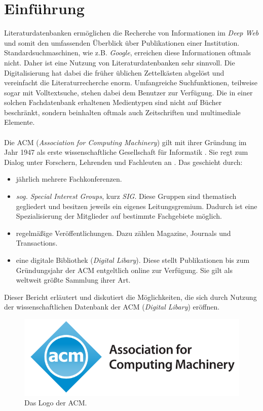 \documentclass[
	ngerman,
	parskip=half,
	headsepline,
	fontsize=12pt,
	DIV=13,
	listof=leveldown,
	]{scrreprt}
\begin{document}
	\chapter{Einführung}	
	Literaturdatenbanken ermöglichen die Recherche von Informationen im \textit{Deep Web} und somit den umfassenden Überblick über Publikationen einer Institution. Standardsuchmaschinen, wie z.B. \textit{Google}, erreichen diese Informationen oftmals nicht. Daher ist eine Nutzung von Literaturdatenbanken sehr sinnvoll. Die Digitalisierung hat dabei die früher üblichen Zettelkästen abgelöst und vereinfacht die Literaturrecherche enorm. Umfangreiche Suchfunktionen, teilweise sogar mit Volltextsuche, stehen dabei dem Benutzer zur Verfügung. Die in einer solchen Fachdatenbank erhaltenen Medientypen sind nicht auf Bücher beschränkt, sondern beinhalten oftmals auch Zeitschriften und multimediale Elemente. \cite{resource:wld}
	\ \\
	\ \\
	Die ACM (\textit{Association for Computing Machinery}) gilt mit ihrer Gründung im Jahr 1947 als erste wissenschaftliche Gesellschaft für Informatik \cite{resource:wacm}. Sie regt zum Dialog unter Forschern, Lehrenden und Fachleuten an \cite{resource:aacm}. Das geschieht durch:
\begin{itemize}
\item jährlich mehrere Fachkonferenzen.
\item \textit{sog. Special Interest Groups}, kurz \textit{SIG}. Diese Gruppen sind thematisch gegliedert und besitzen jeweils ein eigenes Leitungsgremium. Dadurch ist eine Spezialisierung der Mitglieder auf bestimmte Fachgebiete möglich.
\item regelmäßige Veröffentlichungen. Dazu zählen Magazine, Journals und Transactions.
\item eine digitale Bibliothek (\textit{Digital Libary}). Diese stellt Publikationen bis zum Gründungsjahr der ACM entgeltlich online zur Verfügung. Sie gilt als weltweit größte Sammlung ihrer Art.
\end{itemize}
Dieser Bericht erläutert und diskutiert die Möglichkeiten, die sich durch Nutzung der wissenschaftlichen Datenbank der ACM (\textit{Digital Libary}) eröffnen.
\ \\
\begin{figure}[ht]
\begin{minipage}[b]{0.55\linewidth}
\centering
\includegraphics[width=\textwidth]{img/acmLogo.PNG}
\caption{Das Logo der ACM.}
\end{minipage}
\end{figure}
\end{document}
